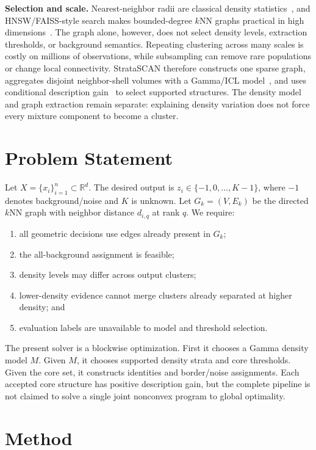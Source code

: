 \documentclass[conference]{IEEEtran}
\newcommand{\method}{StrataSCAN}
\newcommand{\R}{\mathbb{R}}
\begin{document}
\textbf{Selection and scale.}
Nearest-neighbor radii are classical density statistics~\cite{loftsgaarden1965knn}, and HNSW/FAISS-style search makes bounded-degree $k$NN graphs practical in high dimensions~\cite{malkov2020hnsw,johnson2019faiss}. The graph alone, however, does not select density levels, extraction thresholds, or background semantics. Repeating clustering across many scales is costly on millions of observations, while subsampling can remove rare populations or change local connectivity. \method{} therefore constructs one sparse graph, aggregates disjoint neighbor-shell volumes with a Gamma/ICL model~\cite{biernacki2000icl}, and uses conditional description gain~\cite{rissanen1978mdl} to select supported structures. The density model and graph extraction remain separate: explaining density variation does not force every mixture component to become a cluster.

\section{Problem Statement}
Let $X=\{x_i\}_{i=1}^n\subset\R^d$. The desired output is $z_i\in\{-1,0,\ldots,K-1\}$, where $-1$ denotes background/noise and $K$ is unknown. Let $G_k=(V,E_k)$ be the directed $k$NN graph with neighbor distance $d_{i,q}$ at rank $q$. We require:
\begin{enumerate}
  \item all geometric decisions use edges already present in $G_k$;
  \item the all-background assignment is feasible;
  \item density levels may differ across output clusters;
  \item lower-density evidence cannot merge clusters already separated at higher density; and
  \item evaluation labels are unavailable to model and threshold selection.
\end{enumerate}

The present solver is a blockwise optimization. First it chooses a Gamma density model $M$. Given $M$, it chooses supported density strata and core thresholds. Given the core set, it constructs identities and border/noise assignments. Each accepted core structure has positive description gain, but the complete pipeline is not claimed to solve a single joint nonconvex program to global optimality.

\section{Method}
\end{document}
